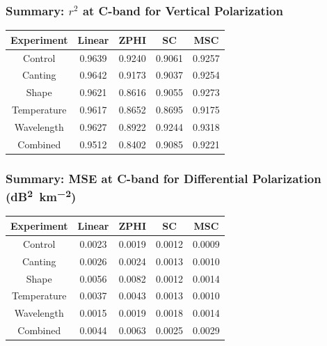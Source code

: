 \documentclass[red]{beamer}
\begin{document}
\begin{frame}
    \frametitle{Summary: $r^2$ at C-band for Vertical Polarization}
    \begin{center}
        \begin{tabular}{| c | c | c | c | c |}
            \hline
            Experiment & Linear & ZPHI & SC & MSC \\
            \hline
            \hline
            Control & 0.9639 & 0.9240 & 0.9061 & 0.9257 \\
            Canting & 0.9642 & 0.9173 & 0.9037 & 0.9254 \\
            Shape & 0.9621 & 0.8616 & 0.9055 & 0.9273 \\
            Temperature & 0.9617 & 0.8652 & 0.8695 & 0.9175 \\
            Wavelength & 0.9627 & 0.8922 & 0.9244 & 0.9318 \\
            Combined & 0.9512 & 0.8402 & 0.9085 & 0.9221 \\
            \hline
        \end{tabular}
    \end{center}
\end{frame}

\begin{frame}
    \frametitle{Summary: MSE at C-band for Differential Polarization (\si{dB\squared\per \kilo\meter\squared})}
    \begin{center}
        \begin{tabular}{| c | c | c | c | c |}
            \hline
            Experiment & Linear & ZPHI & SC & MSC \\
            \hline
            \hline
            Control & 0.0023 & 0.0019 & 0.0012 & 0.0009 \\
            Canting & 0.0026 & 0.0024 & 0.0013 & 0.0010 \\
            Shape & 0.0056 & 0.0082 & 0.0012 & 0.0014 \\
            Temperature & 0.0037 & 0.0043 & 0.0013 & 0.0010 \\
            Wavelength & 0.0015 & 0.0019 & 0.0018 & 0.0014 \\
            Combined & 0.0044 & 0.0063 & 0.0025 & 0.0029 \\
            \hline
        \end{tabular}
    \end{center}
\end{frame}
\end{document}

